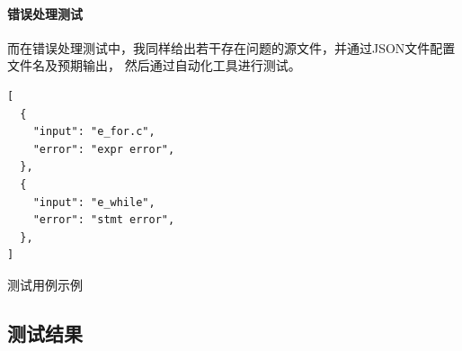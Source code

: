 \paragraph{错误处理测试}
而在错误处理测试中，我同样给出若干存在问题的源文件，并通过JSON文件配置文件名及预期输出，
然后通过自动化工具进行测试。

\begin{listing}[hbt]
\begin{verbatim}
[
  {
    "input": "e_for.c",
    "error": "expr error",
  },
  {
    "input": "e_while",
    "error": "stmt error",
  },
]
\end{verbatim}
\caption{测试用例示例}
\end{listing}

\subsection{测试结果}
